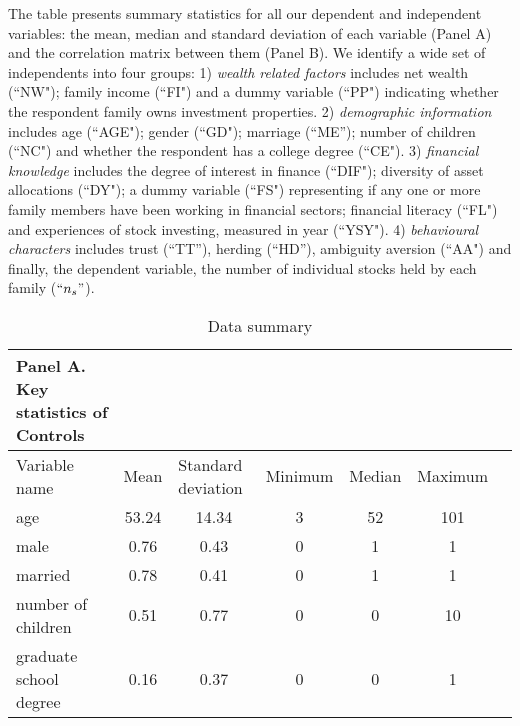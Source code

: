 \documentclass[ukenglish,nottitlepage,thmsb,11pt,letterpaper]{article}
\begin{document}
\begin{spacing}{1}
\begin{table}[H]
\begin{tabular}{L{2.25cm}L{13.25cm}}
 			\bottomrule
 		\end{tabular}%
 	\end{table}%
 \end{spacing}
 
 \begin{spacing}{1}
 	\begin{table}[H]
 		\renewcommand\arraystretch{1.25}%
 		\caption{Data summary } 
 		The table presents summary statistics for all our dependent and independent variables: the mean, median and standard deviation of each variable (Panel A) and the correlation matrix between them (Panel B).  We identify a wide set of independents into four groups: 1) \textit{wealth related factors} includes net wealth (``NW"); family income (``FI") and a dummy variable (``PP") indicating whether the respondent family owns investment properties.  2) \textit{demographic information} includes age (``AGE"); gender (``GD");  marriage (``ME''); number of children (``NC") and whether the respondent has a college degree (``CE"). 3) \textit{financial knowledge} includes the degree of interest in finance (``DIF"); diversity of asset allocations (``DY"); a dummy variable (``FS") representing if any one or more family members have been working in financial sectors; financial literacy (``FL") and experiences of stock investing, measured in year  (``YSY"). 4) \textit{behavioural characters} includes trust (``TT''), herding (``HD''), ambiguity aversion (``AA") and finally, the dependent variable, the number of individual stocks held by each family ($``n_s"$).  
 		\begin{tabular*}{\textwidth}{l @{\extracolsep{\fill}} cccccc}
 	       \\
 			\textbf{Panel A. Key statistics of Controls}\\ 
 			\toprule
 			Variable name  & \multicolumn{1}{l}{Mean} & \multicolumn{1}{l}{Standard deviation} & \multicolumn{1}{l}{Minimum } & \multicolumn{1}{l}{Median} & \multicolumn{1}{l}{Maximum} \\
 			\midrule
 			age                     &53.24  &14.34  &3  &52  &101\\
 			male                    &0.76   &0.43   &0  &1   &1   \\
 			married                 &0.78   &0.41   &0  &1   &1   \\
 			number of children      &0.51   &0.77   &0  &0   &10  \\
 			graduate school degree  &0.16   &0.37   &0  &0   &1    \\

\end{tabular*}
\end{table}
\end{spacing}
\end{document}
